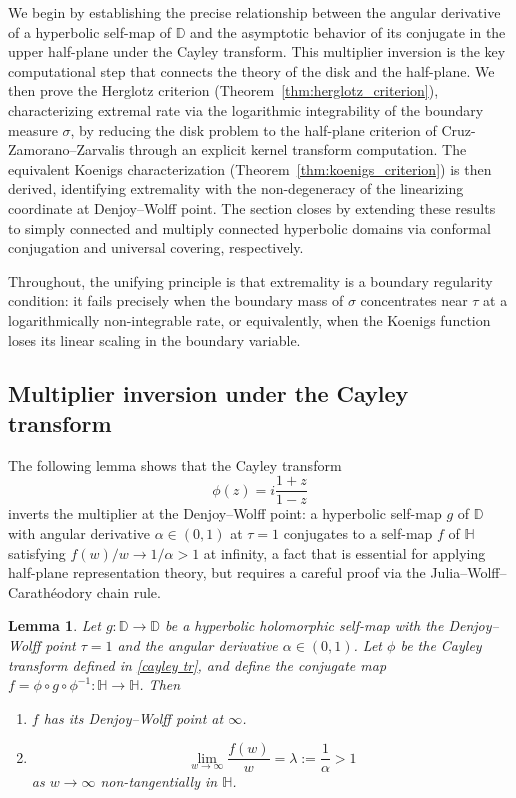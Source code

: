 \documentclass[10pt,a4paper]{amsart}
\numberwithin{equation}{section}
\newtheorem{lemma}[equation]{Lemma}
\begin{document}
We begin by establishing the precise relationship between
the angular derivative of a hyperbolic self-map of
$\mathbb{D}$ and the asymptotic behavior of its conjugate in the upper half-plane under the Cayley transform.
This multiplier inversion is the key computational step that connects the theory of the disk and the half-plane. We then prove the Herglotz criterion
(Theorem~\ref{thm:herglotz_criterion}), characterizing
extremal rate via the logarithmic integrability of the
boundary measure $\sigma$, by reducing the disk problem
to the half-plane criterion of Cruz-Zamorano--Zarvalis
\cite{cruz} through an explicit kernel transform computation.
The equivalent Koenigs characterization
(Theorem~\ref{thm:koenigs_criterion}) is then derived,
identifying extremality with the non-degeneracy of the
linearizing coordinate at Denjoy--Wolff point.
The section closes by extending these results to simply
connected and multiply connected hyperbolic domains via
conformal conjugation and universal covering, respectively.


Throughout, the unifying principle is that extremality is
a boundary regularity condition: it fails precisely when
the boundary mass of $\sigma$ concentrates near $\tau$
at a logarithmically non-integrable rate, or equivalently,
when the Koenigs function loses its linear scaling in the
boundary variable.

\subsection{Multiplier inversion under the Cayley transform}
\label{subsec:cayley}

The following lemma shows that the Cayley transform
\begin{equation}\label{cayley tr}
\phi(z)=i\frac{1+z}{1-z}
\end{equation}
inverts the multiplier at the Denjoy--Wolff point: a hyperbolic self-map
$g$ of $\mathbb{D}$ with angular derivative $\alpha\in(0,1)$ at $\tau=1$
conjugates to a self-map $f$ of $\mathbb{H}$ satisfying
$f(w)/w\to 1/\alpha>1$ at infinity, a fact that is essential for applying
half-plane representation theory, but requires a careful proof via the
Julia--Wolff--Carath\'eodory chain rule.

\begin{lemma}
\label{lem:multiplier_inversion}
Let $g:\mathbb{D}\to\mathbb{D}$ be a hyperbolic holomorphic self-map with
the Denjoy--Wolff point $\tau=1$ and the angular derivative
$\alpha\in(0,1)$. Let $\phi$ be the Cayley transform defined in \eqref{cayley tr}, and define the conjugate map
$f=\phi\circ g\circ\phi^{-1}:\mathbb{H}\to\mathbb{H}$.
Then
\begin{enumerate}
\item[\emph{(i)}] $f$ has its Denjoy--Wolff point at $\infty$.
\item[\emph{(ii)}]
\begin{equation*}
\lim_{w\to\infty}\frac{f(w)}{w}
=
\lambda:=\frac1\alpha>1
\end{equation*}
as $w\to\infty$ non-tangentially in $\mathbb{H}$.
\end{enumerate}
\end{lemma}
\end{document}
